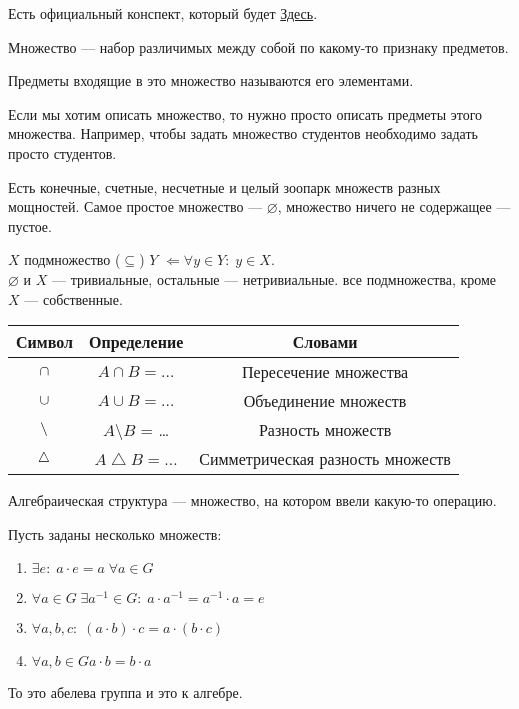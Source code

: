 Есть официальный конспект, который будет \href{}{Здесь}.
\begin{definition}
    Множество --- набор различимых между собой по какому-то признаку предметов.
\end{definition}
\begin{definition}
    Предметы входящие в это множество называются его элементами.
\end{definition}
Если мы хотим описать множество, то нужно просто описать предметы этого множества. Например, чтобы задать множество студентов необходимо задать просто студентов.

Есть конечные, счетные, несчетные и целый зоопарк множеств разных мощностей. Самое простое множество --- $\varnothing$, множество ничего не содержащее --- пустое.
\begin{definition}
     $X$ подмножество ($\subseteq$)  $Y$  $\Leftarrow \forall y \in Y: \; y \in X$. \\
     $\varnothing$ и $X$ --- тривиальные, остальные --- нетривиальные.
     все подмножества, кроме $X$ --- собственные.
\end{definition}

\begin{center}
      \renewcommand{\arraystretch}{1.7}
  \large

\begin{tabular}{| c | c | c |}
    \hline 
    \textbf{Символ} & \textbf{Определение} & \textbf{Словами} \\
    \hline
    $\Large{\cap}$ & $A \cap B = \ldots$ & Пересечение множества \\
    \hline
    $\Large{\cup}$ & $A \cup B= \ldots$ & Объединение множеств \\
    \hline
    $\Large{\setminus}$ & $A\setminus B$ = \ldots & Разность множеств \\
    \hline
    $\Large{\bigtriangleup}$ & $A \bigtriangleup B = \ldots$ & Симметрическая разность множеств \\
    \hline
\end{tabular}
\end{center}
\begin{definition}
    Алгебраическая структура --- множество, на котором ввели какую-то операцию.
\end{definition}
\begin{example}
    Пусть заданы несколько множеств:
     \begin{enumerate}
         \item $\exists e: \; a\cdot e = a\; \forall a \in G$
         \item  $\forall a \in G \; \exists a^{-1} \in G: \; a \cdot a^{-1} = a^{-1} \cdot a = e$ 
         \item $\forall a,b,c:\; (a \cdot b) \cdot c = a \cdot (b \cdot c)$
         \item  $\forall a, b \in G a \cdot b = b \cdot a$
    \end{enumerate}
    То это абелева группа и это к алгебре.
\end{example}

